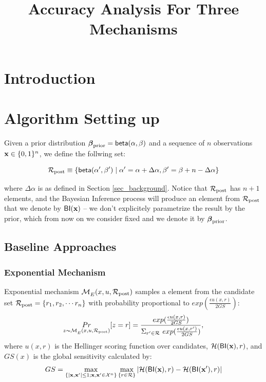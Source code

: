 \documentclass[sigconf]{acmart}
\begin{document}
\title{Accuracy Analysis For Three Mechanisms}


\begin{abstract} 
\end{abstract}



\maketitle

\section{Introduction}
\label{sec_intro}


\section{Algorithm Setting up}
\label{sec_setup}
Given a prior distribution $\boldsymbol{\beta}_{\textup{prior}}=\mathsf{beta}(\alpha, \beta)$ and a sequence of $n$ observations $\textbf{x}\in\{0,1\}^n$, we define the follwing set:

\[
  \mathcal{R}_{\textup{post}}\equiv\{\mathsf{beta}(\alpha',\beta')\mid \alpha'=\alpha+\Delta\alpha, \beta'=\beta+n-\Delta\alpha\}
\]

where $\Delta\alpha$ is as defined in Section
\ref{sec_background}. Notice that $\mathcal{R}_{\textup{post}}$ has $n + 1$ elements, and
the Bayesian Inference process will produce an element from $\mathcal{R}_{\textup{post}}$
that we denote by $\mathsf{BI}(\textbf{x})$ -- we don't explicitely
parametrize the result by the prior, which from now on we consider
fixed and we denote it by $\boldsymbol{\beta}_{\textup{prior}}$.

\subsection{Baseline Approaches} 


\subsubsection{Exponential Mechanism}

Exponential mechanism $\mathcal{M}_E^{}({x},{u},{\mathcal{R}_{\textup{post}}})$ samples a element from the candidate set $\mathcal{R}_{\textup{post}} = \{r_1, r_2, \cdots r_n\}$ with probability proportional to $exp(\frac{\epsilon u(x,r)}{2 GS})$:
\begin{equation*}
\underset{z \thicksim \mathcal{M}_E^{}({x},{u},{\mathcal{R}_{\textup{post}}}) }{Pr}[z=r] = \frac
{exp(\frac{\epsilon u(x,r)}{2 GS})}
{\Sigma_{r' \in \mathcal{R}}\ exp(\frac{\epsilon u(x,r')}{2 GS})},
\end{equation*}
where $u(x,r)$ is the Hellinger scoring function over candidates, $\mathcal{H}(\mathsf{BI}(\textbf{x}), r)$, and $GS(x)$ is the global sensitivity calculated by:
\begin{equation*}
GS = 
\max_{\{|\textbf{x},\textbf{x}'| \leq 1;\textbf{x},\textbf{x}'\in \mathcal{X}^n\}}\max_{\{r\in \mathcal{R}\}}
|\mathcal{H}(\mathsf{BI}(\textbf{x}), r) - \mathcal{H}(\mathsf{BI}(\textbf{x}'), r)|
\end{equation*}
\end{document}
